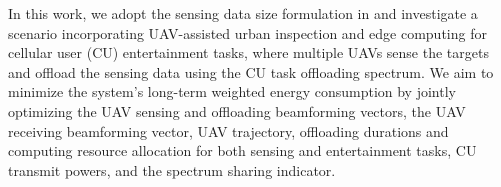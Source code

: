 \documentclass[10pt,journal,compsoc]{IEEEtran}
\newcommand{\rev}[1]{{\color{red}#1}} %
\newcommand{\rev}[1]{#1}
\begin{document}
In this work, we adopt the sensing data size formulation in \cite{Related works:ISCC-PRO:WCL:Energy-Efficient-Integrated, Related works:ISCC-PRO:TWC:Joint-Sensing-And} and investigate a scenario incorporating UAV-assisted urban inspection and edge computing for cellular user (CU) entertainment tasks, where multiple UAVs sense the targets and offload the sensing data using the \rev{CU task offloading spectrum}. 
We aim to minimize the system's long-term weighted energy consumption by jointly optimizing the UAV sensing and offloading beamforming vectors, the UAV receiving beamforming vector, UAV trajectory, offloading durations and computing resource allocation for both sensing and entertainment tasks, \rev{CU transmit powers}, and the spectrum sharing indicator.
\end{document}
